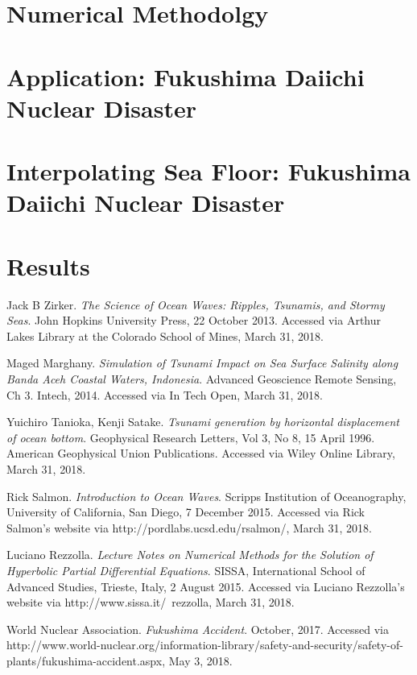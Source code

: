 \documentclass[12pt,a4]{article}
\begin{document}
\section{Numerical Methodolgy}


\section{Application: Fukushima Daiichi Nuclear Disaster}


\section{Interpolating Sea Floor: Fukushima Daiichi Nuclear Disaster}


\section{Results }


\begin{thebibliography}{1}
Jack B Zirker.
\textit{The Science of Ocean Waves: Ripples, Tsunamis, and Stormy Seas}.
John Hopkins University Press, 22 October 2013. 
Accessed via Arthur Lakes Library at the Colorado School of Mines, March 31, 2018.
    
Maged Marghany.
\textit{Simulation of Tsunami Impact on Sea Surface Salinity along Banda Aceh Coastal Waters, Indonesia}.
Advanced Geoscience Remote Sensing, Ch 3. Intech, 2014. Accessed via In Tech Open, March 31, 2018.
    
Yuichiro Tanioka, Kenji Satake.
\textit{Tsunami generation by horizontal displacement of ocean bottom}.
Geophysical Research Letters, Vol 3, No 8, 15 April 1996. American Geophysical Union Publications. Accessed via Wiley Online Library, March 31, 2018.

Rick Salmon.
\textit{Introduction to Ocean Waves}.
Scripps Institution of Oceanography, University of California, San Diego, 7 December 2015. Accessed via Rick Salmon's website via http://pordlabs.ucsd.edu/rsalmon/, March 31, 2018.

Luciano Rezzolla.
\textit{Lecture Notes on Numerical Methods for the Solution of Hyperbolic Partial Differential Equations}.
SISSA, International School of Advanced Studies, Trieste, Italy, 2 August 2015. Accessed via Luciano Rezzolla's website via http://www.sissa.it/~rezzolla, March 31, 2018.

World Nuclear Association.
\textit{Fukushima Accident}.
October, 2017. Accessed via http://www.world-nuclear.org/information-library/safety-and-security/safety-of-plants/fukushima-accident.aspx, May 3, 2018.

\end{thebibliography}
	
\end{document}

